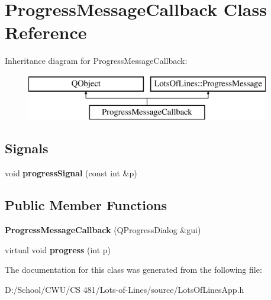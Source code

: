 \hypertarget{class_progress_message_callback}{}\section{Progress\+Message\+Callback Class Reference}
\label{class_progress_message_callback}
Inheritance diagram for Progress\+Message\+Callback\+:\begin{figure}[H]
\begin{center}
\leavevmode
\includegraphics[height=2.000000cm]{class_progress_message_callback}
\end{center}
\end{figure}
\subsection*{Signals}
\begin{DoxyCompactItemize}
\item 
void {\bfseries progress\+Signal} (const int \&p)\hypertarget{class_progress_message_callback_a8d47a5048f6b10874a6bf4f874830b64}{}\label{class_progress_message_callback_a8d47a5048f6b10874a6bf4f874830b64}

\end{DoxyCompactItemize}
\subsection*{Public Member Functions}
\begin{DoxyCompactItemize}
\item 
{\bfseries Progress\+Message\+Callback} (Q\+Progress\+Dialog \&gui)\hypertarget{class_progress_message_callback_a212a38b4df9aef9b1dd35f5d1c961b86}{}\label{class_progress_message_callback_a212a38b4df9aef9b1dd35f5d1c961b86}

\item 
virtual void {\bfseries progress} (int p)\hypertarget{class_progress_message_callback_ad3e87c2805aa0fe02f207d40923fa928}{}\label{class_progress_message_callback_ad3e87c2805aa0fe02f207d40923fa928}

\end{DoxyCompactItemize}


The documentation for this class was generated from the following file\+:\begin{DoxyCompactItemize}
\item 
D\+:/\+School/\+C\+W\+U/\+C\+S 481/\+Lots-\/of-\/\+Lines/source/Lots\+Of\+Lines\+App.\+h\end{DoxyCompactItemize}
